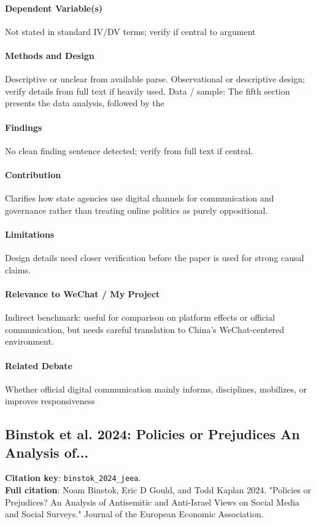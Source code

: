 \documentclass[12pt]{article}
\begin{document}
\paragraph{Dependent Variable(s)} Not stated in standard IV/DV terms; verify if central to argument

\paragraph{Methods and Design} Descriptive or unclear from available parse. Observational or descriptive design; verify details from full text if heavily used. Data / sample: The fifth section presents the data analysis, followed by the

\paragraph{Findings} No clean finding sentence detected; verify from full text if central.

\paragraph{Contribution} Clarifies how state agencies use digital channels for communication and governance rather than treating online politics as purely oppositional.

\paragraph{Limitations} Design details need closer verification before the paper is used for strong causal claims.

\paragraph{Relevance to WeChat / My Project} Indirect benchmark: useful for comparison on platform effects or official communication, but needs careful translation to China's WeChat-centered environment.

\paragraph{Related Debate} Whether official digital communication mainly informs, disciplines, mobilizes, or improves responsiveness


\subsection{Binstok et al. 2024: Policies or Prejudices An Analysis of...}
\textbf{Citation key}: \texttt{binstok\_2024\_jeea}.\\
\textbf{Full citation}: Noam Binstok, Eric D Gould, and Todd Kaplan 2024. "Policies or Prejudices? An Analysis of Antisemitic and Anti-Israel Views on Social Media and Social Surveys." Journal of the European Economic Association.
\end{document}

